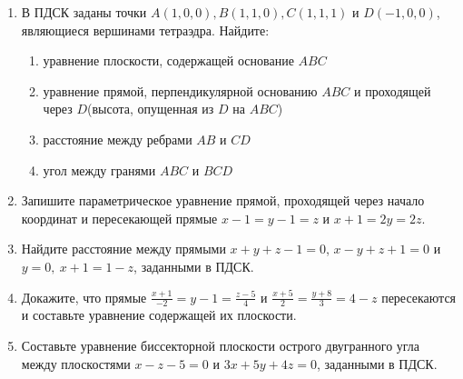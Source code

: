 \begin{enumerate}
    \item В ПДСК заданы точки $A(1, 0, 0), B(1, 1, 0), C(1, 1, 1)$ и $D(-1, 0, 0)$, являющиеся вершинами тетраэдра. Найдите:
         \begin{enumerate}
	        \item уравнение плоскости, содержащей основание $ABC$
	        \item уравнение прямой, перпендикулярной основанию $ABC$ и проходящей через $D$(высота, опущенная из $D$ на $ABC$)
	        \item расстояние между ребрами $AB$ и $CD$
	        \item угол между гранями $ABC$ и $BCD$ 
	    \end{enumerate}

    \item Запишите параметрическое уравнение прямой, проходящей через начало координат и пересекающей прямые $x-1 = y-1 = z$ и $x+1 = 2y = 2z$.
    
    \item Найдите расстояние между прямыми $x+y+z-1=0$, $x-y+z+1=0$ и $y=0,\ x+1=1-z$, заданными в ПДСК.
    
    \item Докажите, что прямые $\frac{x+1}{-2}=y-1 = \frac{z-5}{4}$ и $\frac{x+5}{2}=\frac{y+8}{3}= 4-z$ пересекаются и составьте уравнение содержащей их плоскости.
    
    \item Составьте уравнение биссекторной плоскости острого двугранного угла между плоскостями $x - z - 5 = 0$ и $3x + 5y + 4z = 0$, заданными в ПДСК.
\end{enumerate}
